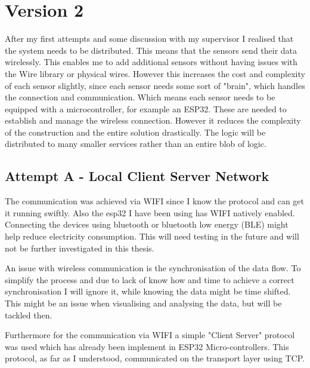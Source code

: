 \chapter*{Version 2}
\label{chap:Technical CHallenges}
\renewcommand{\thesection}{\arabic{section}}
\setcounter{section}{0}

After my first attempts and some discussion with my supervisor I realised that the system needs to be distributed. This means that the sensors send their data wirelessly. This enables me to add additional sensors without having issues with the Wire library or physical wires. However this increases the cost and complexity of each sensor slightly, since each sensor needs some sort of "brain", which handles the connection and communication. Which means each sensor needs to be equipped with a microcontroller, for example an ESP32. These are needed to establish and manage the wireless connection.
However it reduces the complexity of the construction and the entire solution drastically. The logic will be distributed to many smaller services rather than an entire blob of logic. 

\section{Attempt A - Local Client Server Network}

The communication was achieved via WIFI since I know the protocol and can get it running swiftly. Also the esp32 I have been using has WIFI natively enabled. Connecting the devices using bluetooth or bluetooth low energy (BLE) might help reduce electricity consumption. This will need testing in the future and will not be further investigated in this thesis.

An issue with wireless communication is the synchronisation of the data flow. To simplify the process and due to lack of know how and time to achieve a correct synchronisation I will ignore it, while knowing the data might be time shifted. 
This might be an issue when visualising and analysing the data, but will be tackled then.

Furthermore for the communication via WIFI a simple "Client Server" protocol was used which has already been implement in ESP32 Micro-controllers. This protocol, as far as I understood, communicated on the transport layer using TCP.\cite{arduinoi4:online} \cite{ESP32Ser71:online}

